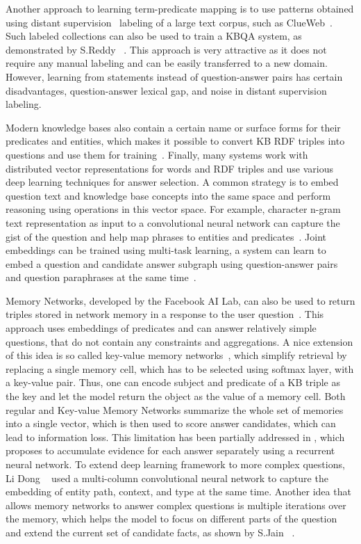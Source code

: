 Another approach to learning term-predicate mapping is to use patterns obtained using distant supervision~\cite{MintzBSJ09} labeling of a large text corpus, such as ClueWeb~\cite{yao2014freebase}.
Such labeled collections can also be used to train a KBQA system, as demonstrated by S.Reddy \etal~\cite{ReddyLS14,reddy2016transforming}.
This approach is very attractive as it does not require any manual labeling and can be easily transferred to a new domain.
However, learning from statements instead of question-answer pairs has certain disadvantages, \eg question-answer lexical gap, and noise in distant supervision labeling.

Modern knowledge bases also contain a certain name or surface forms for their predicates and entities, which makes it possible to convert KB RDF triples into questions and use them for training~\cite{BordesCW14:emnlp}.
Finally, many systems work with distributed vector representations for words and RDF triples and use various deep learning techniques for answer selection.
A common strategy is to embed question text and knowledge base concepts into the same space and perform reasoning using operations in this vector space.
For example, character n-gram text representation as input to a convolutional neural network can capture the gist of the question and help map phrases to entities and predicates~\cite{yih2014semantic}.
Joint embeddings can be trained using multi-task learning, \eg a system can learn to embed a question and candidate answer subgraph using question-answer pairs and question paraphrases at the same time~\cite{BordesCW14:emnlp}.

Memory Networks, developed by the Facebook AI Lab, can also be used to return triples stored in network memory in a response to the user question~\cite{bordes2015large}.
This approach uses embeddings of predicates and can answer relatively simple questions, that do not contain any constraints and aggregations.
A nice extension of this idea is so called key-value memory networks~\cite{miller2016key}, which simplify retrieval by replacing a single memory cell, which has to be selected using softmax layer, with a key-value pair.
Thus, one can encode subject and predicate of a KB triple as the key and let the model return the object as the value of a memory cell.
Both regular and Key-value Memory Networks summarize the whole set of memories into a single vector, which is then used to score answer candidates, which can lead to information loss.
This limitation has been partially addressed in \cite{henaff2016tracking,wang2016reading}, which proposes to accumulate evidence for each answer separately using a recurrent neural network.
To extend deep learning framework to more complex questions, Li Dong \etal~\cite{dong2015question} used a multi-column convolutional neural network to capture the embedding of entity path, context, and type at the same time.
Another idea that allows memory networks to answer complex questions is multiple iterations over the memory, which helps the model to focus on different parts of the question and extend the current set of candidate facts, as shown by S.Jain \etal~\cite{jain2016question}.

